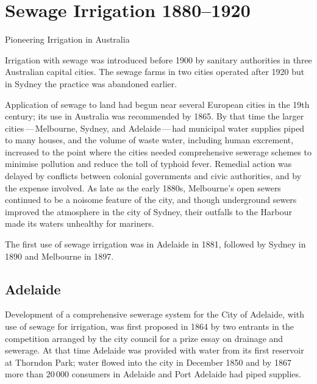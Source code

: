 
\setcounter{endnote}{0}

\chapter{Sewage Irrigation 1880--1920}
\label{ch:sewage}
%
{Pioneering Irrigation in Australia}

Irrigation with sewage was introduced before 1900 by sanitary
authorities in three Australian capital cities.  The sewage farms in
two cities operated after 1920 but in Sydney the practice was
abandoned earlier.

Application of sewage to land had begun near several European cities
in the 19th century; its use in Australia was recommended by 1865.  By
that time the larger cities\,---\,Melbourne, Sydney, and
Adelaide\,---\,had municipal water supplies piped to many houses, and
the volume of waste water, including human excrement, increased to the
point where the cities needed comprehensive sewerage schemes to
minimise pollution and reduce the toll of typhoid fever.  Remedial
action was delayed by conflicts between colonial governments and civic
authorities, and by the expense involved.  As late as the early 1880s,
Melbourne's open sewers continued to be a noisome feature of the city,
and though underground sewers improved the atmosphere in the city of
Sydney, their outfalls to the Harbour made its waters unhealthy for
mariners.


The first use of sewage irrigation was in Adelaide in 1881, followed
by Sydney in 1890 and Melbourne in 1897.

\section*{Adelaide}

Development of a comprehensive sewerage system for the City of
Adelaide, with use of sewage for irrigation, was first proposed in
1864 by two entrants in the competition arranged by the city council
for a prize essay on drainage and sewerage.  At that time Adelaide was
provided with water from its first reservoir at Thorndon Park; water
flowed into the city in December 1850 and by 1867 more than 20\,000
consumers in Adelaide and Port Adelaide had piped
supplies.

